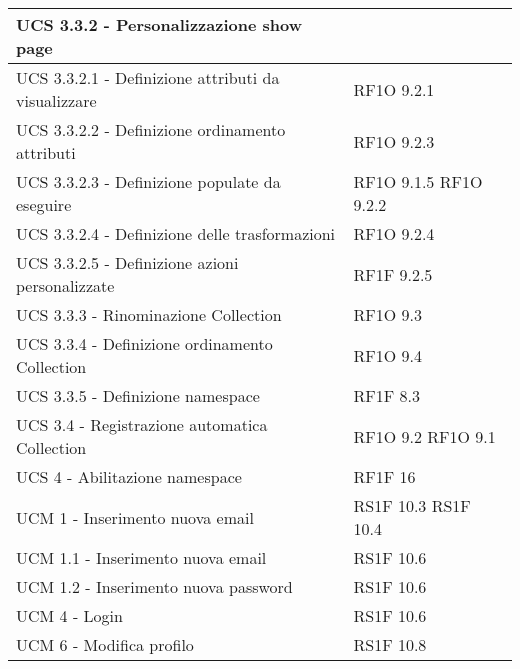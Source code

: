 \begin{center}
\begin{longtable}{ | p{5cm} | p{5cm} |}
						UCS 3.3.2 - Personalizzazione show page &  \\ \hline      
						UCS 3.3.2.1 -  Definizione attributi da visualizzare &  RF1O 9.2.1 \newline  \\ \hline      
						UCS 3.3.2.2 - Definizione ordinamento attributi &  RF1O 9.2.3 \newline  \\ \hline      
						UCS 3.3.2.3 - Definizione populate da eseguire &  RF1O 9.1.5 \newline  RF1O 9.2.2 \newline  \\ \hline      
						UCS 3.3.2.4 - Definizione delle trasformazioni &  RF1O 9.2.4 \newline  \\ \hline      
						UCS 3.3.2.5 - Definizione azioni personalizzate &  RF1F 9.2.5 \newline  \\ \hline      
						UCS 3.3.3  - Rinominazione Collection &  RF1O 9.3 \newline  \\ \hline      
						UCS 3.3.4  - Definizione ordinamento Collection &  RF1O 9.4 \newline  \\ \hline      
						UCS 3.3.5 - Definizione namespace &  RF1F 8.3 \newline  \\ \hline      
						UCS 3.4  - Registrazione automatica Collection &  RF1O 9.2 \newline  RF1O 9.1 \newline  \\ \hline      
						UCS 4 - Abilitazione namespace &  RF1F 16 \newline  \\ \hline      
						UCM 1 -  Inserimento nuova email &  RS1F 10.3 \newline  RS1F 10.4 \newline  \\ \hline      
						UCM 1.1 -  Inserimento nuova email &  RS1F 10.6 \newline  \\ \hline      
						UCM 1.2 - Inserimento nuova password &  RS1F 10.6 \newline  \\ \hline      
						UCM 4 - Login &  RS1F 10.6 \newline  \\ \hline      
						UCM 6 - Modifica profilo &  RS1F 10.8 \newline  \\ \hline      

\end{longtable}
\end{center}
